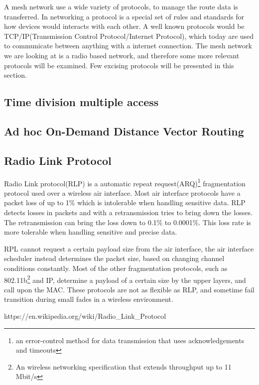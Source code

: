 A mesh network use a wide variety of protocols, to manage the route data is transferred.
In networking a protocol is a special set of rules and standards for how devices would interacts with each other.
A well known protocols would be TCP/IP(Transmission Control Protocol/Internet Protocol), which today are used to communicate between anything with a internet connection.
The mesh network we are looking at is a radio based network, and therefore some more relevant protocols will be examined. 
Few excising protocols will be presented in this section.

\subsection{Time division multiple access}

\subsection{Ad hoc On-Demand Distance Vector Routing}

\subsection{Radio Link Protocol}
Radio Link protocol(RLP) is a automatic repeat request(ARQ)\footnote{an error-control method for data transmission that uses acknowledgements and timeouts} fragmentation protocol used over a wireless air interface.
Most air interface protocols have a packet loss of up to 1\% which is intolerable when handling sensitive data.
RLP detects losses in packets and with a retransmission tries to bring down the losses.
The retransmission can bring the loss down to 0.1\% to 0.0001\%.
This loss rate is more tolerable when handling sensitive and precise data.

RPL cannot request a certain payload size from the air interface, the air interface scheduler instead determines the packet size, based on changing channel conditions constantly.
Most of the other fragmentation protocols, such as 802.11b\footnote{An wireless networking specification that extends throughput up to 11 Mbit/s} and IP, determine a payload of a certain size by the upper layers, and call upon the MAC.
These protocols are not as flexible as RLP, and sometime fail transition during small fades in a wireless environment. 

https://en.wikipedia.org/wiki/Radio_Link_Protocol